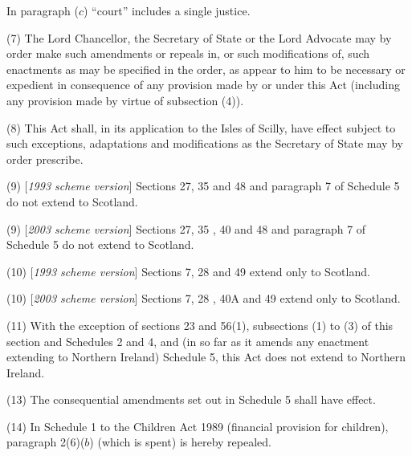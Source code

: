 \documentclass[12pt,a4paper]{article}
\begin{document}
In paragraph ($c$)  “court” includes a single justice.

(7) The Lord Chancellor, the Secretary of State or the Lord Advocate may by order make such amendments or repeals in, or such modifications of, such enactments as may be specified in the order, as appear to him to be necessary or expedient in consequence of any provision made by or under this Act (including any provision made by virtue of subsection (4)).

(8) This Act shall, in its application to the Isles of Scilly, have effect subject to such exceptions, adaptations and modifications as the Secretary of State may by order prescribe.

(9) [\emph{1993 scheme version}] Sections 27, 35 and 48 and paragraph 7 of Schedule 5 do not extend to Scotland.

(9) [\emph{2003 scheme version}] Sections 27, 35%
, 40  %
 and 48 and paragraph 7 of Schedule 5 do not extend to Scotland.

(10) [\emph{1993 scheme version}] Sections 7, 28 and 49 extend only to Scotland.

(10) [\emph{2003 scheme version}] Sections 7, 28%
, 40A  %
 and 49 extend only to Scotland.

(11) With the exception of sections 23 and 56(1), subsections (1)  to (3)  of this section and Schedules 2 and 4, and (in so far as it amends any enactment extending to Northern Ireland) Schedule 5, this Act does not extend to Northern Ireland.


(13) The consequential amendments set out in Schedule 5 shall have effect.

(14) In Schedule 1 to the Children Act 1989 (financial provision for children), paragraph 2(6)($b$)  (which is spent) is hereby repealed.

\end{document}
